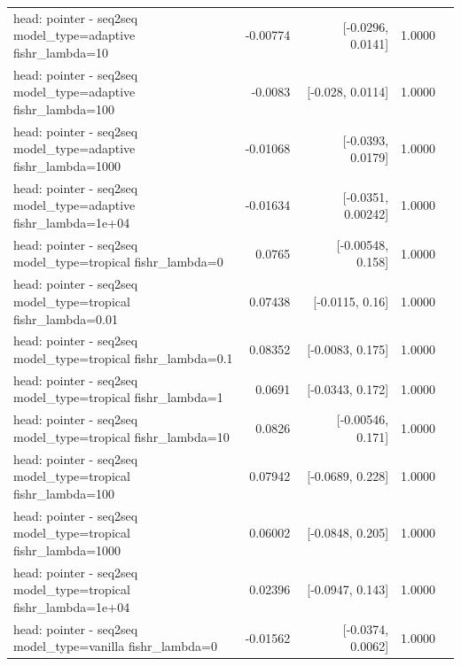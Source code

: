 \documentclass[10pt]{article}
\makeatletter
\newcommand{\stackcell}[1]{\begin{tabular}[t]{@{}l@{}}#1\end{tabular}}
\makeatother
\begin{document}
{\begin{longtable}{lrrrl}
\stackcell{head: pointer - seq2seq\\\footnotesize model\_type=adaptive fishr\_lambda=10 } & -0.00774 & [-0.0296, 0.0141] & 1.0000 & \\
\stackcell{head: pointer - seq2seq\\\footnotesize model\_type=adaptive fishr\_lambda=100 } & -0.0083 & [-0.028, 0.0114] & 1.0000 & \\
\stackcell{head: pointer - seq2seq\\\footnotesize model\_type=adaptive fishr\_lambda=1000 } & -0.01068 & [-0.0393, 0.0179] & 1.0000 & \\
\stackcell{head: pointer - seq2seq\\\footnotesize model\_type=adaptive fishr\_lambda=1e+04 } & -0.01634 & [-0.0351, 0.00242] & 1.0000 & \\
\stackcell{head: pointer - seq2seq\\\footnotesize model\_type=tropical fishr\_lambda=0 } & 0.0765 & [-0.00548, 0.158] & 1.0000 & \\
\stackcell{head: pointer - seq2seq\\\footnotesize model\_type=tropical fishr\_lambda=0.01 } & 0.07438 & [-0.0115, 0.16] & 1.0000 & \\
\stackcell{head: pointer - seq2seq\\\footnotesize model\_type=tropical fishr\_lambda=0.1 } & 0.08352 & [-0.0083, 0.175] & 1.0000 & \\
\stackcell{head: pointer - seq2seq\\\footnotesize model\_type=tropical fishr\_lambda=1 } & 0.0691 & [-0.0343, 0.172] & 1.0000 & \\
\stackcell{head: pointer - seq2seq\\\footnotesize model\_type=tropical fishr\_lambda=10 } & 0.0826 & [-0.00546, 0.171] & 1.0000 & \\
\stackcell{head: pointer - seq2seq\\\footnotesize model\_type=tropical fishr\_lambda=100 } & 0.07942 & [-0.0689, 0.228] & 1.0000 & \\
\stackcell{head: pointer - seq2seq\\\footnotesize model\_type=tropical fishr\_lambda=1000 } & 0.06002 & [-0.0848, 0.205] & 1.0000 & \\
\stackcell{head: pointer - seq2seq\\\footnotesize model\_type=tropical fishr\_lambda=1e+04 } & 0.02396 & [-0.0947, 0.143] & 1.0000 & \\
\stackcell{head: pointer - seq2seq\\\footnotesize model\_type=vanilla fishr\_lambda=0 } & -0.01562 & [-0.0374, 0.0062] & 1.0000 & \\

\end{longtable}}
\end{document}

